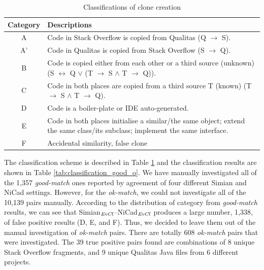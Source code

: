 \documentclass{sig-alternate-05-2015}
\begin{document}

\begin{table}
	\centering
	\caption{Classifications of clone creation}
	\label{tab:classification_scheme}
	\begin{tabular}{|c|p{13cm}|}
		\hline 
		Category & Descriptions \\ 
		\hline 
		A & Code in Stack Overflow is copied from Qualitas (Q $\rightarrow$ S). \\ 
		\hline 
		A' & Code in Qualitas is copied from Stack Overflow (S $\rightarrow$ Q). \\ 
		\hline 
		B & Code is copied either from each other or a third source (unknown) (S $\leftrightarrow$ Q $\vee$ (T $\rightarrow$ S $\wedge$ T $\rightarrow$ Q)).
		\\ 
		\hline 
		C & Code in both places are copied from a third source T (known) (T $\rightarrow$ S $\wedge$ T $\rightarrow$ Q).
		\\ 
		\hline 
		D & Code is a boiler-plate or IDE auto-generated.
		\\ 
		\hline 
		E & Code in both places initialise a similar/the same object; extend the same class/its subclass; implement the same interface.
		\\ 
		\hline 
		F & Accidental similarity, false clone \\ 
		\hline 
	\end{tabular} 
\end{table}

The classification scheme is described in Table \ref{tab:classification_scheme} and the classification results are shown in Table \ref{tab:classification_good_o}. We have manually investigated all of the 1,357 \textit{good-match} ones reported by agreement of four different Simian and NiCad settings.  However, for the \textit{ok-match}, we could not investigate all of the 10,139 pairs manually.  According to the distribution of category from \textit{good-match} results, we can see that Simian$_{\textrm{\textit{EvCl}}}$--NiCad$_{\textrm{\textit{EvCl}}}$ produces a large number, 1,338, of false positive results (D, E, and F). Thus, we decided to leave them out of the manual investigation of \textit{ok-match} pairs. There are totally 608 \textit{ok-match} pairs that were investigated. The 39 true positive pairs found are combinations of 8 unique Stack Overflow fragments, and 9 unique Qualitas Java files from 6 different projects.
\end{document}
